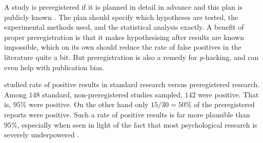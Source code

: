 A study is preregistered if it is planned in detail in advance and this plan is publicly known \parencite{Van_t_Veer2016-fo}. The plan should specify which hypotheses are tested, the experimental methods used, and the statistical analysis exactly. A benefit of proper preregistration is that it makes hypothesising after results are known impossible, which on its own should reduce the rate of false positives in the literature quite a bit. But preregistration is also a remedy for \emph{p}-hacking, and can even help with publication bias.

\textcite{Scheel2020-sq} studied rate of positive results in standard research versus preregistered research. Among $148$ standard, non-preregistered studies sampled, $142$ were positive. That is, $95\%$ were positive. On the other hand only $15/30=50\%$ of the preregistered reports were positive. Such a rate of positive results is far more plausible than $95\%$, especially when seen in light of the fact that most psychological research is severely underpowered \parencite{Sedlmeier1989-zz}.



